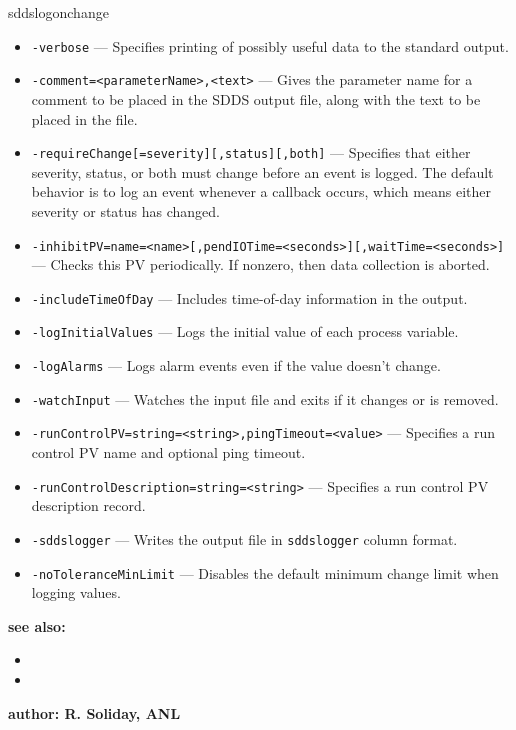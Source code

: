 \begin{sddsprog}{sddslogonchange}
\begin{itemize}
        \item {\tt -verbose} --- Specifies printing of possibly useful data to the standard output.
        \item {\tt -comment=<parameterName>,<text>} --- Gives the parameter name for a comment to be placed in the SDDS output file, along with the text to be placed in the file.
        \item {\tt -requireChange[=severity][,status][,both]} --- Specifies that either severity, status, or both must change before an event is logged.  The default behavior is to log an event whenever a callback occurs, which means either severity or status has changed.
        \item {\tt -inhibitPV=name=<name>[,pendIOTime=<seconds>][,waitTime=<seconds>]} --- Checks this PV periodically.  If nonzero, then data collection is aborted.
        \item {\tt -includeTimeOfDay} --- Includes time-of-day information in the output.
        \item {\tt -logInitialValues} --- Logs the initial value of each process variable.
        \item {\tt -logAlarms} --- Logs alarm events even if the value doesn't change.
        \item {\tt -watchInput} --- Watches the input file and exits if it changes or is removed.
        \item {\tt -runControlPV=string=<string>,pingTimeout=<value>} --- Specifies a run control PV name and optional ping timeout.
        \item {\tt -runControlDescription=string=<string>} --- Specifies a run control PV description record.
        \item {\tt -sddslogger} --- Writes the output file in \verb+sddslogger+ column format.
        \item {\tt -noToleranceMinLimit} --- Disables the default minimum change limit when logging values.
    \end{itemize}

\item {\bf see also:}
    \begin{itemize}
    \item {}
    \item {}
    \end{itemize}
\item {\bf author: R. Soliday, ANL} 
\end{sddsprog}

